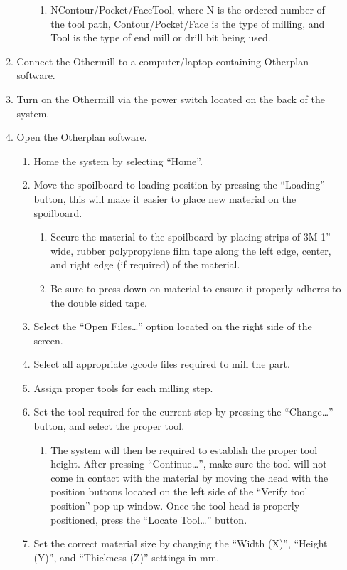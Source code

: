 \begin{enumerate}
\begin{enumerate}
\begin{enumerate}
					\begin{enumerate}
						\item NContour/Pocket/FaceTool, where N is the ordered number of the tool path, Contour/Pocket/Face is the type of milling, and Tool is the type of end mill or drill bit being used.
					\end{enumerate}
			\end{enumerate}
		\item Connect the Othermill to a computer/laptop containing Otherplan software. 
		\item Turn on the Othermill via the power switch located on the back of the system.
		\item Open the Otherplan software.
			\begin{enumerate}
		\item Home the system by selecting “Home”.
		\item Move the spoilboard to loading position by pressing the “Loading” button, this will make it easier to place new material on the spoilboard.
			\begin{enumerate}
				\item Secure the material to the spoilboard by placing strips of 3M 1” wide, rubber polypropylene film tape along the left edge, center, and right edge (if required) of the material.
				\item Be sure to press down on material to ensure it properly adheres to the double sided tape.
			\end{enumerate}
		\item Select the “Open Files…” option located on the right side of the screen.
		\item Select all appropriate .gcode files required to mill the part.
		\item Assign proper tools for each milling step.  
		\item Set the tool required for the current step by pressing the “Change…” button, and select the proper tool.
			\begin{enumerate}
				\item The system will then be required to establish the proper tool height.  After pressing “Continue…”, make sure the tool will not come in contact with the material by moving the head with the position buttons located on the left side of the “Verify tool position” pop-up window.  Once the tool head is properly positioned, press the “Locate Tool…” button.
			\end{enumerate}
		\item Set the correct material size by changing the “Width (X)”, “Height (Y)”, and “Thickness (Z)” settings in mm.  

\end{enumerate}
\end{enumerate}
\end{enumerate}
